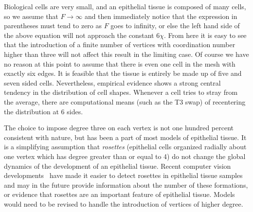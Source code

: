 Biological cells are very small, and an epithelial tissue is composed of many cells, so we assume that $F\to\infty$ and then immediately notice that the expression in parentheses must tend to zero as $F$ goes to infinity, or else the left hand side of the above equation will not approach the constant $6\chi$. From here it is easy to see that the introduction of a finite number of vertices with coordination number higher than three will not affect this result in the limiting case. Of course we have no reason at this point to assume that there is even one cell in the mesh with exactly six edges. It is feasible that the tissue is entirely be made up of five and seven sided cells. Nevertheless, empirical evidence shows a strong central tendency in the distribution of cell shapes. Whenever a cell tries to stray from the average, there are computational means (such as the T3 swap) of recentering the distribution at 6 sides.

The choice to impose degree three on each vertex is not one hundred percent consistent with nature, but has been a part of most models of epithelial tissue.  It is a simplifying assumption that \emph{rosettes} (epithelial cells organized radially about one vertex which has degree greater than or equal to 4) do not change the global dynamics of the development of an epithelial tissue.  Recent computer vision developments~\cite{rose} have made it easier to detect rosettes in epithelial tissue samples and may in the future provide information about the number of these formations, or evidence that rosettes are an important feature of epithelial tissue. Models would need to be revised to handle the introduction of vertices of higher degree.

